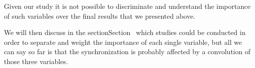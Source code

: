 Given our study it is not possible to discriminate and understand the importance of such variables over the final results that we presented above.

We will then discuss in the  sectionSection~ which studies could be conducted in order to separate and weight the importance of each single variable, but all we can say so far is that the synchronization is probably affected by a convolution of those three variables.